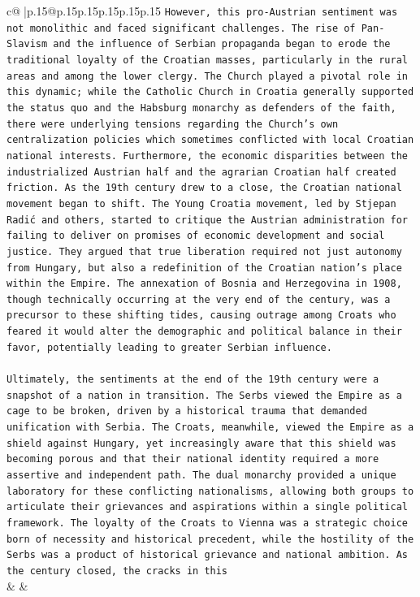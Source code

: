 \documentclass{article}
\begin{document}
{\begin{supertabular}{c@{$\;$}|p{.15\linewidth}@{}p{.15\linewidth}p{.15\linewidth}p{.15\linewidth}p{.15\linewidth}p{.15\linewidth}}
{{{\texttt{However, this pro{-}Austrian sentiment was not monolithic and faced significant challenges. The rise of Pan{-}Slavism and the influence of Serbian propaganda began to erode the traditional loyalty of the Croatian masses, particularly in the rural areas and among the lower clergy. The Church played a pivotal role in this dynamic; while the Catholic Church in Croatia generally supported the status quo and the Habsburg monarchy as defenders of the faith, there were underlying tensions regarding the Church's own centralization policies which sometimes conflicted with local Croatian national interests. Furthermore, the economic disparities between the industrialized Austrian half and the agrarian Croatian half created friction. As the 19th century drew to a close, the Croatian national movement began to shift. The Young Croatia movement, led by Stjepan Radić and others, started to critique the Austrian administration for failing to deliver on promises of economic development and social justice. They argued that true liberation required not just autonomy from Hungary, but also a redefinition of the Croatian nation's place within the Empire. The annexation of Bosnia and Herzegovina in 1908, though technically occurring at the very end of the century, was a precursor to these shifting tides, causing outrage among Croats who feared it would alter the demographic and political balance in their favor, potentially leading to greater Serbian influence.} \\
\\ 
\texttt{Ultimately, the sentiments at the end of the 19th century were a snapshot of a nation in transition. The Serbs viewed the Empire as a cage to be broken, driven by a historical trauma that demanded unification with Serbia. The Croats, meanwhile, viewed the Empire as a shield against Hungary, yet increasingly aware that this shield was becoming porous and that their national identity required a more assertive and independent path. The dual monarchy provided a unique laboratory for these conflicting nationalisms, allowing both groups to articulate their grievances and aspirations within a single political framework. The loyalty of the Croats to Vienna was a strategic choice born of necessity and historical precedent, while the hostility of the Serbs was a product of historical grievance and national ambition. As the century closed, the cracks in this} \\
            }
        }
    }
    & & \\ \\


\end{supertabular}}
\end{document}
